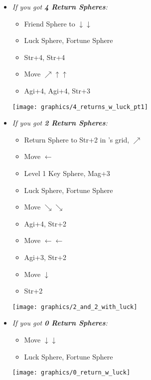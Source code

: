 \begin{spheregrid}
	\begin{itemize}
		\yunaf
		\begin{itemize}
			\item \textit{If you got \textbf{4 Return Spheres}:}
			      \begin{itemize}
				      \item Friend Sphere to \lulu $\downarrow\downarrow$
				      \item Luck Sphere, Fortune Sphere
				      \item Str+4, Str+4
				      \item Move $\nearrow\uparrow\uparrow$
				      \item Agi+4, Agi+4, Str+3
			      \end{itemize}
			      \texttt{[image: graphics/4\_returns\_w\_luck\_pt1]}
			      \columnbreak
			\item \textit{If you got \textbf{2 Return Spheres}:}
			      \begin{itemize}
				      \item Return Sphere to Str+2 in \wakka's grid, $\nearrow$
				      \item Move $\leftarrow$
				      \item Level 1 Key Sphere, Mag+3
				      \item Luck Sphere, Fortune Sphere
				      \item Move $\searrow\searrow$
				      \item Agi+4, Str+2
				      \item Move $\leftarrow\leftarrow$
				      \item Agi+3, Str+2
				      \item Move $\downarrow$
				      \item Str+2
			      \end{itemize}
			      \texttt{[image: graphics/2\_and\_2\_with\_luck]}
			\item \textit{If you got \textbf{0 Return Spheres}:}
			      \begin{itemize}
				      \item Move $\downarrow\downarrow$
				      \item Luck Sphere, Fortune Sphere
			      \end{itemize}
			      \texttt{[image: graphics/0\_return\_w\_luck]}
		\end{itemize}
	\end{itemize}
\end{spheregrid}
